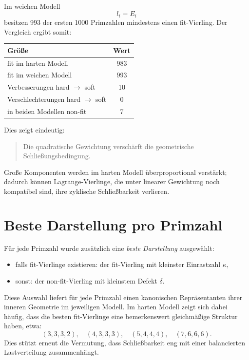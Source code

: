 \documentclass[11pt,a4paper]{article}
\theoremstyle{remark}
\begin{document}
	Im weichen Modell
	\[
	l_i=E_i
	\]
	besitzen 993 der ersten 1000 Primzahlen mindestens einen fit-Vierling. Der Vergleich ergibt somit:
	
	\begin{center}
		\begin{tabular}{lc}
			\toprule
			Größe & Wert \\
			\midrule
			fit im harten Modell & 983 \\
			fit im weichen Modell & 993 \\
			Verbesserungen hard \(\to\) soft & 10 \\
			Verschlechterungen hard \(\to\) soft & 0 \\
			in beiden Modellen non-fit & 7 \\
			\bottomrule
		\end{tabular}
	\end{center}
	
	Dies zeigt eindeutig:
	\begin{quote}
		Die quadratische Gewichtung verschärft die geometrische Schließungsbedingung.
	\end{quote}
	
	Große Komponenten werden im harten Modell überproportional verstärkt; dadurch können Lagrange-Vierlinge, die unter linearer Gewichtung noch kompatibel sind, ihre zyklische Schließbarkeit verlieren.
	
	\section{Beste Darstellung pro Primzahl}
	
	Für jede Primzahl wurde zusätzlich eine \emph{beste Darstellung} ausgewählt:
	
	\begin{itemize}
		\item falls fit-Vierlinge existieren: der fit-Vierling mit kleinster Einrastzahl \(\kappa\),
		\item sonst: der non-fit-Vierling mit kleinstem Defekt \(\delta\).
	\end{itemize}
	
	Diese Auswahl liefert für jede Primzahl einen kanonischen Repräsentanten ihrer inneren Geometrie im jeweiligen Modell. Im harten Modell zeigt sich dabei häufig, dass die besten fit-Vierlinge eine bemerkenswert gleichmäßige Struktur haben, etwa:
	\[
	(3,3,3,2),\quad
	(4,3,3,3),\quad
	(5,4,4,4),\quad
	(7,6,6,6).
	\]
	Dies stützt erneut die Vermutung, dass Schließbarkeit eng mit einer balancierten Lastverteilung zusammenhängt.
	
\end{document}
